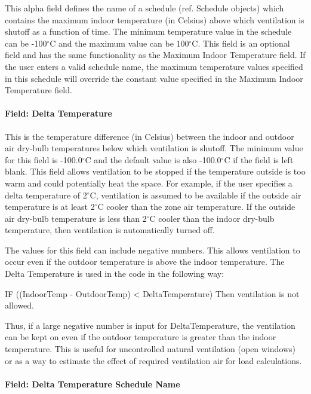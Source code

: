 This alpha field defines the name of a schedule (ref. Schedule objects) which contains the maximum indoor temperature (in Celsius) above which ventilation is shutoff as a function of time. The minimum temperature value in the schedule can be -100$^\circ$C and the maximum value can be 100$^\circ$C. This field is an optional field and has the same functionality as the Maximum Indoor Temperature field. If the user enters a valid schedule name, the maximum temperature values specified in this schedule will override the constant value specified in the Maximum Indoor Temperature field.

\paragraph{Field: Delta Temperature}\label{field-delta-temperature}

This is the temperature difference (in Celsius) between the indoor and outdoor air dry-bulb temperatures below which ventilation is shutoff. The minimum value for this field is -100.0$^\circ$C and the default value is also -100.0$^\circ$C if the field is left blank. This field allows ventilation to be stopped if the temperature outside is too warm and could potentially heat the space. For example, if the user specifies a delta temperature of 2$^\circ$C, ventilation is assumed to be available if the outside air temperature is at least 2$^\circ$C cooler than the zone air temperature. If the outside air dry-bulb temperature is less than 2$^\circ$C cooler than the indoor dry-bulb temperature, then ventilation is automatically turned off.

The values for this field can include negative numbers. This allows ventilation to occur even if the outdoor temperature is above the indoor temperature. The Delta Temperature is used in the code in the following way:

IF ((IndoorTemp - OutdoorTemp) \textless{} DeltaTemperature) Then ventilation is not allowed.

Thus, if a large negative number is input for DeltaTemperature, the ventilation can be kept on even if the outdoor temperature is greater than the indoor temperature. This is useful for uncontrolled natural ventilation (open windows) or as a way to estimate the effect of required ventilation air for load calculations.

\paragraph{Field: Delta Temperature Schedule Name}\label{field-delta-temperature-schedule-name}


